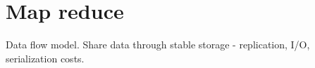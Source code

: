 \chapter{Map reduce}

Data flow model.
Share data through stable storage - replication, I/O, serialization costs.